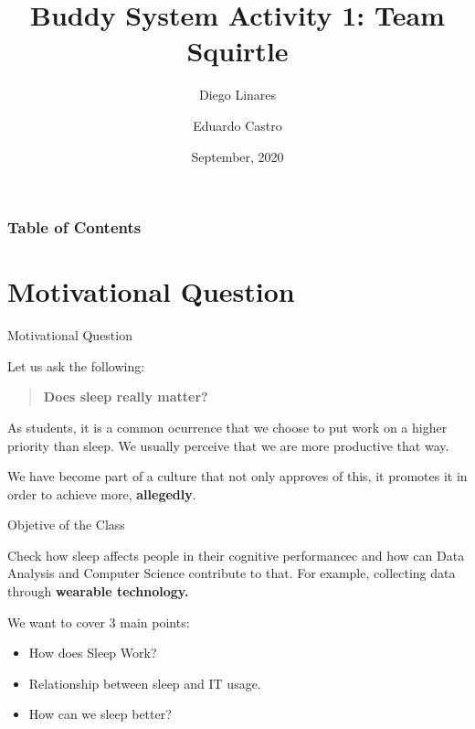\documentclass{beamer}
\title{Buddy System Activity 1: Team Squirtle}
\author{Diego Linares \and Eduardo Castro }
\institute{University of Engineering and Technology - UTEC\\ACM-UTEC - IEEE-CS}
\date{September, 2020}
\begin{document}
\frame{\titlepage}

\begin{frame}
    \frametitle{Table of Contents}
    \tableofcontents
\end{frame}

\section{Motivational Question}

\begin{frame}{Motivational Question}

Let us ask the following: \\

\medskip

\begin{quotation}
    \textbf{Does sleep really matter?} \\
\end{quotation}

\medskip

As students, it is a common ocurrence that we choose to put work on a higher priority than sleep. We usually perceive that we are more productive that way. \\

\medskip

We have become part of a culture that not only approves of this, it promotes it in order to achieve more, \textbf{allegedly}.
    
\end{frame}

\begin{frame}{Objetive of the Class}

Check how sleep affects people in their cognitive performancec and how can Data Analysis and Computer Science contribute to that. For example, collecting data through \textbf{wearable technology.} \\

\medskip

We want to cover 3 main points:

\begin{itemize}
    \item How does Sleep Work?
    \item Relationship between sleep and IT usage.
    \item How can we sleep better?
\end{itemize}
    
\end{frame}
\end{document}
